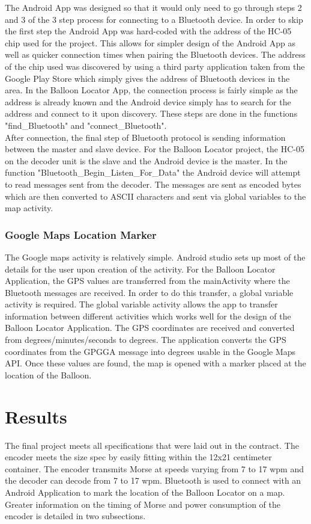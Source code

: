 \documentclass[12pt, letterpaper]{article}
\begin{document}
The Android App was designed so that it would only need to go through steps 2 and 3 of the 3 step process for connecting to a Bluetooth device. In order to skip the first step the Android App was hard-coded with the address of the HC-05 chip used for the project. This allows for simpler design of the Android App as well as quicker connection times when pairing the Bluetooth devices. The address of the chip used was discovered by using a third party application taken from the Google Play Store which simply gives the address of Bluetooth devices in the area. In the Balloon Locator App, the connection process is fairly simple as the address is already known and the Android device simply has to search for the address and connect to it upon discovery. These steps are done in the functions "find\_Bluetooth" and "connect\_Bluetooth". \\

After connection, the final step of Bluetooth protocol is sending information between the master and slave device. For the Balloon Locator project, the HC-05 on the decoder unit is the slave and the Android device is the master. In the function "Bluetooth\_Begin\_Listen\_For\_Data" the Android device will attempt to read messages sent from the decoder. The messages are sent as encoded bytes which are then converted to ASCII characters and sent via global variables to the map activity. 



\subsubsection{Google Maps Location Marker}

The Google maps activity is relatively simple. Android studio sets up most of the details for the user upon creation of the activity. For the Balloon Locator Application, the GPS values are transferred from the mainActivity where the Bluetooth messages are received. In order to do this transfer, a global variable activity is required. The global variable activity allows the app to transfer information between different activities which works well for the design of the Balloon Locator Application. The GPS coordinates are received and converted from degrees/minutes/seconds to degrees. The application converts the GPS coordinates from the GPGGA message into degrees usable in the Google Maps API. Once these values are found, the map is opened with a marker placed at the location of the Balloon. 


\section{Results}
The final project meets all specifications that were laid out in the contract. The encoder meets the size spec by easily fitting within the 12x21 centimeter container. The encoder transmits Morse at speeds varying from 7 to 17 wpm and the decoder can decode from 7 to 17 wpm. Bluetooth is used to connect with an Android Application to mark the location of the Balloon Locator on a map. Greater information on the timing of Morse and power consumption of the encoder is detailed in two subsections.  
\end{document}
